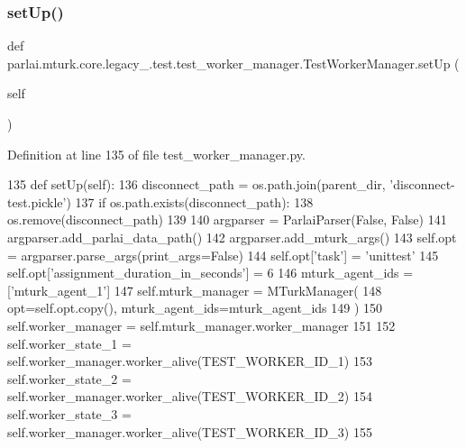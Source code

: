 \subsubsection{\texorpdfstring{set\+Up()}{setUp()}}
{\footnotesize\ttfamily def parlai.\+mturk.\+core.\+legacy\+\_.\+test.\+test\+\_\+worker\+\_\+manager.\+Test\+Worker\+Manager.\+set\+Up (\begin{DoxyParamCaption}\item[{}]{self }\end{DoxyParamCaption})}



Definition at line 135 of file test\+\_\+worker\+\_\+manager.\+py.


\begin{DoxyCode}
135     \textcolor{keyword}{def }setUp(self):
136         disconnect\_path = os.path.join(parent\_dir, \textcolor{stringliteral}{'disconnect-test.pickle'})
137         \textcolor{keywordflow}{if} os.path.exists(disconnect\_path):
138             os.remove(disconnect\_path)
139 
140         argparser = ParlaiParser(\textcolor{keyword}{False}, \textcolor{keyword}{False})
141         argparser.add\_parlai\_data\_path()
142         argparser.add\_mturk\_args()
143         self.opt = argparser.parse\_args(print\_args=\textcolor{keyword}{False})
144         self.opt[\textcolor{stringliteral}{'task'}] = \textcolor{stringliteral}{'unittest'}
145         self.opt[\textcolor{stringliteral}{'assignment\_duration\_in\_seconds'}] = 6
146         mturk\_agent\_ids = [\textcolor{stringliteral}{'mturk\_agent\_1'}]
147         self.mturk\_manager = MTurkManager(
148             opt=self.opt.copy(), mturk\_agent\_ids=mturk\_agent\_ids
149         )
150         self.worker\_manager = self.mturk\_manager.worker\_manager
151 
152         self.worker\_state\_1 = self.worker\_manager.worker\_alive(TEST\_WORKER\_ID\_1)
153         self.worker\_state\_2 = self.worker\_manager.worker\_alive(TEST\_WORKER\_ID\_2)
154         self.worker\_state\_3 = self.worker\_manager.worker\_alive(TEST\_WORKER\_ID\_3)
155 
\end{DoxyCode}
\mbox{\label{classparlai_1_1mturk_1_1core_1_1legacy__2018_1_1test_1_1test__worker__manager_1_1TestWorkerManager_ab336c773a303cf0b208ad6df95f8a061}} 
